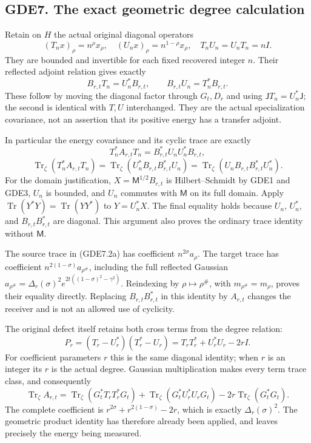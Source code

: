 \subsection{GDE7. The exact geometric degree
calculation}\label{gde7.-the-exact-geometric-degree-calculation}

Retain on \(H\) the actual original diagonal operators \[
(T_nx)_\rho=n^\rho x_\rho,\quad
(U_nx)_\rho=n^{1-\rho}x_\rho,
\quad T_nU_n=U_nT_n=nI.
\tag{GDE7.1}
\] They are bounded and invertible for each fixed recovered integer
\(n\). Their reflected adjoint relation gives exactly \[
B_{r,t}T_n=U_n^*B_{r,t},\qquad
B_{r,t}U_n=T_n^*B_{r,t}.
\tag{GDE7.2}
\] These follow by moving the diagonal factor through \(G_t,D_r\) and
using \(\mathsf JT_n=U_n^*\mathsf J\); the second is identical with
\(T,U\) interchanged. They are the actual specialization covariance, not
an assertion that its positive energy has a transfer adjoint.

In particular the energy covariance and its cyclic trace are exactly \[
T_n^*A_{r,t}T_n=B_{r,t}^*U_nU_n^*B_{r,t},
\] \[
\boxed{\operatorname{Tr}_\zeta(T_n^*A_{r,t}T_n)
=\operatorname{Tr}_\zeta(U_n^*B_{r,t}B_{r,t}^*U_n)
=\operatorname{Tr}_\zeta(U_nB_{r,t}B_{r,t}^*U_n^*).}
\tag{GDE7.2a}
\] For the domain justification, \(X=\mathsf M^{1/2}B_{r,t}\) is
Hilbert--Schmidt by GDE1 and GDE3, \(U_n\) is bounded, and \(U_n\)
commutes with \(\mathsf M\) on its full domain. Apply
\(\operatorname{Tr}(Y^*Y)=\operatorname{Tr}(YY^*)\) to \(Y=U_n^*X\). The
final equality holds because \(U_n\), \(U_n^*\), and
\(B_{r,t}B_{r,t}^*\) are diagonal. This argument also proves the
ordinary trace identity without \(\mathsf M\).

The source trace in (GDE7.2a) has coefficient \(n^{2\sigma}a_\rho\). The
target trace has coefficient \(n^{2(1-\sigma)}a_{\rho^\#}\), including
the full reflected Gaussian
\(a_{\rho^\#}=\Delta_r(\sigma)^2e^{2t((1-\sigma)^2-\gamma^2)}\).
Reindexing by \(\rho\mapsto\rho^\#\), with \(m_{\rho^\#}=m_\rho\),
proves their equality directly. Replacing \(B_{r,t}B_{r,t}^*\) in this
identity by \(A_{r,t}\) changes the receiver and is not an allowed use
of cyclicity.

The original defect itself retains both cross terms from the degree
relation: \[
\boxed{P_r=(T_r-U_r^*)(T_r^*-U_r)
=T_rT_r^*+U_r^*U_r-2rI.}
\tag{GDE7.3}
\] For coefficient parameters \(r\) this is the same diagonal identity;
when \(r\) is an integer its \(r\) is the actual degree. Gaussian
multiplication makes every term trace class, and consequently \[
\operatorname{Tr}_{\zeta}A_{r,t}
=\operatorname{Tr}_{\zeta}(G_t^*T_rT_r^*G_t)
+\operatorname{Tr}_{\zeta}(G_t^*U_r^*U_rG_t)
-2r\operatorname{Tr}_{\zeta}(G_t^*G_t).
\tag{GDE7.4}
\] The complete coefficient is \(r^{2\sigma}+r^{2(1-\sigma)}-2r\), which
is exactly \(\Delta_r(\sigma)^2\). The geometric product identity has
therefore already been applied, and leaves precisely the energy being
measured.

